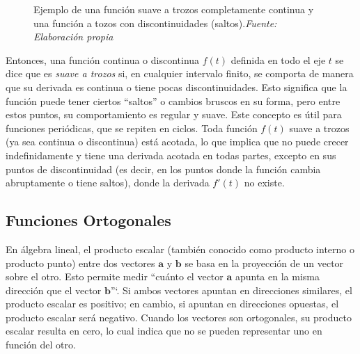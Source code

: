 \begin{figure}[H]
\begin{minipage}{0.5\textwidth}
	\end{minipage}
	\caption[Ejemplo de una función suave a trozos completamente continua y una función a tozos con discontinuidades (saltos).]{Ejemplo de una función suave a trozos completamente continua y una función a tozos con discontinuidades (saltos).\textit{Fuente: Elaboración propia}}
	\label{fig:funcion-suave-trozos}  %
\end{figure}
Entonces, una función continua o discontinua \( f(t) \) definida en todo el eje \( t \) se dice que es \textit{suave a trozos} si, en cualquier intervalo finito, se comporta de manera que su derivada es continua o tiene pocas discontinuidades. Esto significa que la función puede tener ciertos  ``saltos'' o cambios bruscos en su forma, pero entre estos puntos, su comportamiento es regular y suave. Este concepto es útil para funciones periódicas, que se repiten en ciclos. Toda función \( f(t) \) suave a trozos (ya sea continua o discontinua) está acotada, lo que implica que no puede crecer indefinidamente y tiene una derivada acotada en todas partes, excepto en sus puntos de discontinuidad (es decir, en los puntos donde la función cambia abruptamente o tiene saltos), donde la derivada \( f'(t) \) no existe. ~\cite{fourierTolstov}

\subsection{Funciones Ortogonales}
En álgebra lineal, el producto escalar (también conocido como producto interno o producto punto) entre dos vectores \(\mathbf{a}\) y \(\mathbf{b}\) se basa en la proyección de un vector sobre el otro. Esto permite medir ``cuánto el vector \(\mathbf{a}\) apunta en la misma dirección que el vector \(\mathbf{b}\)''`. Si ambos vectores apuntan en direcciones similares, el producto escalar es positivo; en cambio, si apuntan en direcciones opuestas, el producto escalar será negativo. Cuando los vectores son ortogonales, su producto escalar resulta en cero, lo cual indica que no se pueden representar uno en función del otro. \cite{algebraLinealPoole}


